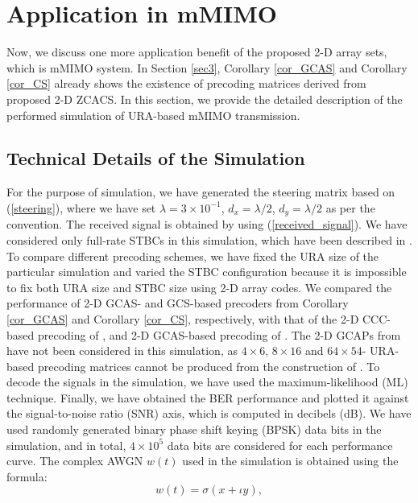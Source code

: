 \documentclass[pdflatex,sn-mathphys-num]{sn-jnl}%
\theoremstyle{thmstyleone}
\begin{document}
	
	\section{Application in mMIMO}\label{sec6}
	Now, we discuss one more application benefit of the proposed 2-D array sets, which is mMIMO system. In Section \ref{sec3}, Corollary \ref{cor_GCAS} and Corollary \ref{cor_CS} already shows the existence of precoding matrices derived from proposed 2-D ZCACS. In this section, we provide the detailed description of the performed simulation of URA-based mMIMO transmission.
	
	\subsection{Technical Details of the Simulation}
	For the purpose of simulation, we have generated the steering matrix based on (\ref{steering}),  where we have set $\lambda = 3 \times 10^{-1} $, $d_x=\lambda/2$, $d_y=\lambda/2$ as per the convention. The received signal is obtained by using (\ref{received_signal}). We have considered only full-rate STBCs in this simulation, which have been described in \cite[Construction I]{STBC}. To compare different precoding schemes, we have fixed the URA size of the particular simulation and varied the STBC configuration because it is impossible to fix both URA size and STBC size using 2-D array codes. We compared the performance of 2-D GCAS- and GCS-based precoders from  Corollary \ref{cor_GCAS} and Corollary \ref{cor_CS}, respectively, with that of the 2-D CCC-based precoding of \cite{OmniChen}, and 2-D GCAS-based precoding of \cite{YuboGCAS,YuboGCAS2,ZilongLiuOmni2024}. The 2-D GCAPs from \cite{YuboMIMO2024} have not been considered in this simulation, as  $4 \times 6$, $8 \times 16$ and  $64 \times 54$- URA-based precoding matrices cannot be produced from the construction of \cite{YuboMIMO2024}. To decode the signals in the simulation, we have used the maximum-likelihood (ML) technique. Finally, we have obtained the BER performance and plotted it against the signal-to-noise ratio (SNR) axis, which is computed in decibels (dB). We have used randomly generated binary phase shift keying (BPSK) data bits in the simulation, and in total, $4 \times 10^{5}$ data bits are considered for each performance curve. The complex AWGN $w(t)$ used in the simulation is obtained using the formula:
	\begin{equation}
		w(t)=\sigma \left( x + \iota y \right), 
	\end{equation}	
\end{document}
